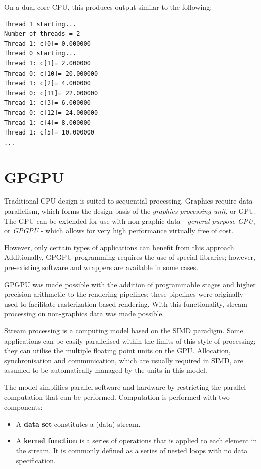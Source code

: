 On a dual-core CPU, this produces output similar to the following:
\begin{lstlisting}
Thread 1 starting... 
Number of threads = 2 
Thread 1: c[0]= 0.000000 
Thread 0 starting... 
Thread 1: c[1]= 2.000000 
Thread 0: c[10]= 20.000000 
Thread 1: c[2]= 4.000000 
Thread 0: c[11]= 22.000000 
Thread 1: c[3]= 6.000000 
Thread 0: c[12]= 24.000000 
Thread 1: c[4]= 8.000000 
Thread 1: c[5]= 10.000000 
...
\end{lstlisting}

\section{GPGPU}
Traditional CPU design is suited to sequential processing. Graphics require data parallelism, which forms the design basis of the \textit{graphics processing unit}, or GPU. The GPU can be extended for use with non-graphic data - \textit{general-purpose GPU}, or \textit{GPGPU} - which allows for very high performance virtually free of cost.

However, only certain types of applications can benefit from this approach. Additionally, GPGPU programming requires the use of special libraries; however, pre-existing software and wrappers are available in some cases.

GPGPU was made possible with the addition of programmable stages and higher precision arithmetic to the rendering pipelines; these pipelines were originally used to facilitate rasterization-based rendering. With this functionality, stream processing on non-graphics data was made possible.

Stream processing is a computing model based on the SIMD paradigm. Some applications can be easily parallelised within the limits of this style of processing; they can utilise the multiple floating point units on the GPU. Allocation, synchronisation and communication, which are usually required in SIMD, are assumed to be automatically managed by the units in this model.

The model simplifies parallel software and hardware by restricting the parallel computation that can be performed. Computation is performed with two components: \begin{itemize}
\item A \textbf{data set} constitutes a (data) stream.
\item A \textbf{kernel function} is a series of operations that is applied to each element in the stream. It is commonly defined as a series of nested loops with no data specification.
\end{itemize}

